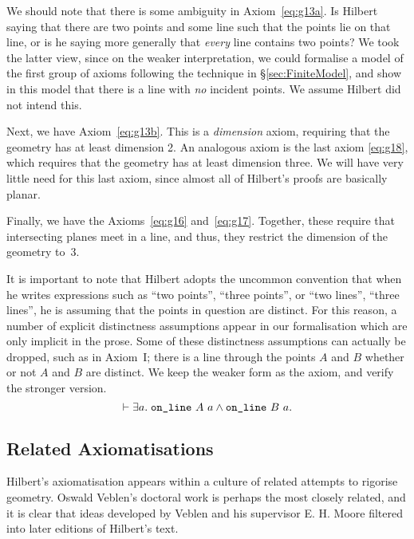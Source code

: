 \label{sec:DanglingPoints}
We should note that there is some ambiguity in Axiom~\ref{eq:g13a}. Is Hilbert saying that there are two points and some line such that the points lie on that line, or is he saying more generally that \emph{every} line contains two points? We took the latter view, since on the weaker interpretation, we could formalise a model of the first group of axioms following the technique in \S\ref{sec:FiniteModel}, and show in this model that there is a line with \emph{no} incident points. We assume Hilbert did not intend this.

Next, we have Axiom~\ref{eq:g13b}. This is a \emph{dimension} axiom, requiring that the geometry has at least dimension 2. An analogous axiom is the last axiom \eqref{eq:g18}, which requires that the geometry has at least dimension three. We will have very little need for this last axiom, since almost all of Hilbert's proofs are basically planar.

Finally, we have the Axioms~\ref{eq:g16} and~\ref{eq:g17}. Together, these require that intersecting planes meet in a line, and thus, they restrict the dimension of the geometry to~3.

It is important to note that Hilbert adopts the uncommon convention that when he writes expressions such as ``two points'', ``three points'', or ``two lines'', ``three lines'', he is assuming that the points in question are distinct\label{sec:DistinctVars}. For this reason, a number of explicit distinctness assumptions appear in our formalisation which are only implicit in the prose. Some of these distinctness assumptions can actually be dropped, such as in Axiom~I; there is a line through the points $A$ and $B$ whether or not $A$ and $B$ are distinct. We keep the weaker form as the axiom, and verify the stronger version.
\begin{displaymath}
  \vdash \exists a.\; \texttt{on\_line}\ A\ a \wedge \texttt{on\_line}\ B\ a.
\end{displaymath}

\subsection{Related Axiomatisations}
Hilbert's axiomatisation appears within a culture of related attempts to rigorise geometry. Oswald Veblen's doctoral work \cite{Veblenphd} is perhaps the most closely related, and it is clear that ideas developed by Veblen and his supervisor E. H. Moore filtered into later editions of Hilbert's text.

